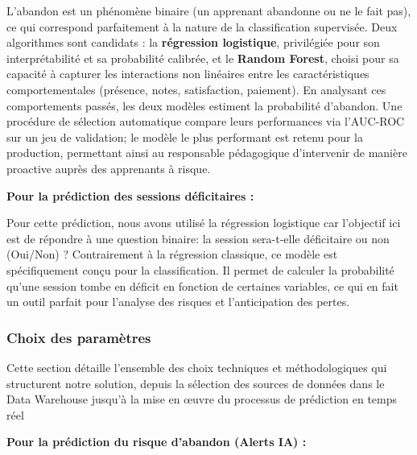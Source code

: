 \noindent L'abandon est un phénomène binaire (un apprenant abandonne ou 
    ne le fait pas), ce qui correspond parfaitement à la nature de 
    la classification supervisée. Deux algorithmes sont candidats : 
    la \textbf{régression logistique}, privilégiée pour son 
    interprétabilité et sa probabilité calibrée, et le 
    \textbf{Random Forest}, choisi pour sa capacité à capturer les 
    interactions non linéaires entre les caractéristiques 
    comportementales (présence, notes, satisfaction, paiement). 
    En analysant ces comportements passés, les deux modèles 
    estiment la probabilité d'abandon. Une procédure de sélection 
    automatique compare leurs performances via l'AUC-ROC sur un 
    jeu de validation; le modèle le plus performant est retenu 
    pour la production, permettant ainsi au responsable 
    pédagogique d'intervenir de manière proactive auprès des 
    apprenants à risque.
\vspace{0.3cm}

\noindent \textbf{Pour la prédiction des sessions déficitaires :} 

\noindent Pour cette prédiction, nous avons utilisé la régression logistique car l'objectif ici est de répondre à une question binaire: la session sera-t-elle déficitaire ou non (Oui/Non) ? Contrairement à la régression classique, ce modèle est spécifiquement conçu pour la classification. Il permet de calculer la probabilité qu'une session tombe en déficit en fonction de certaines variables, ce qui en fait un outil parfait pour l'analyse des risques et l'anticipation des pertes.


\subsubsection{Choix des paramètres}
 Cette section détaille l'ensemble des choix techniques et méthodologiques qui structurent notre solution, depuis la sélection des sources de données dans le Data Warehouse jusqu'à la mise en œuvre du processus de prédiction en temps réel


\noindent\textbf{Pour la prédiction du risque d'abandon (Alerts IA) :}

